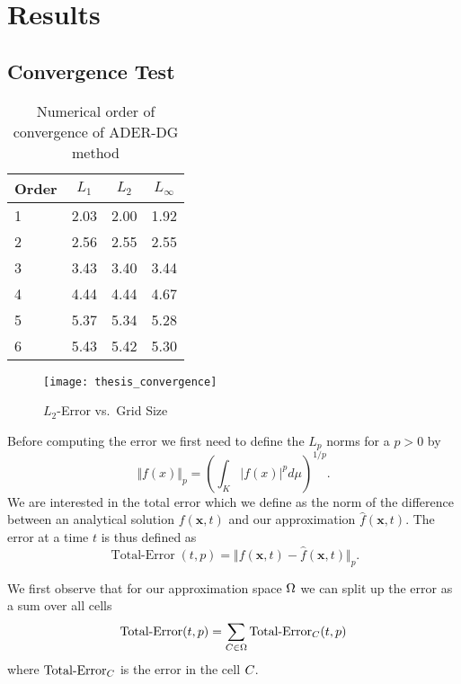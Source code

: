 \chapter{Results}\label{chap:results}
\section{Convergence Test}
\begin{table}[htb]
  \centering
\caption{Numerical order of convergence of ADER-DG method}%
\label{tab:convergence-order}
\begin{tabular}{@{}lS[table-format=1.2]S[table-format=1.2]S[table-format=1.2]@{}}
\toprule
{Order} & {$L_1$} & {$L_2$} & {$L_\infty$}\\  & 2.03 & 2.00 & 1.92\\
2 & 2.56 & 2.55 & 2.55\\
3 & 3.43 & 3.40 & 3.44\\
4 & 4.44 & 4.44 & 4.67\\
5 & 5.37 & 5.34 & 5.28\\
6 & 5.43 & 5.42 & 5.30\\
\bottomrule
\end{tabular}
\end{table}

\begin{figure}[htb]
  \centering
  \texttt{[image: thesis\_convergence]}
  \caption{$L_2$-Error vs.\ Grid Size}
  \label{fig:convergence-l2-error}
\end{figure}

\newcommand{\error}{\operatorname{Total-Error}}

Before computing the error we first need to define the $L_p$ norms for a $p > 0$ by
\begin{equation}
  \label{eq:Lp-nrom}
  \Vert f(x) \Vert_p = \left( \int_K \vert f(x) \vert^p d\mu  \right)^{1/p}.
\end{equation}
We are interested in the total error which we define as the norm of the difference between an analytical solution $f(\bm{x}, t)$ and our approximation $\hat{f}(\bm{x}, t)$.
The error at a time $t$ is thus defined as
\begin{equation}
  \label{eq:error}
  \error(t,p) = \Vert f(\bm{x}, t) - \hat{f}(\bm{x}, t) \Vert_p.
\end{equation}

We first observe that for our approximation space $\broken$ we can split up the error as a sum over all cells
\begin{equation}
  \label{eq:lp-norm-broken}
  \error(t,p) = \sum_{\cell[] \in \broken} \error_{\cell[]}(t,p)
\end{equation}
where $\error_{\cell[]}$ is the error in the cell $\cell[]$.

